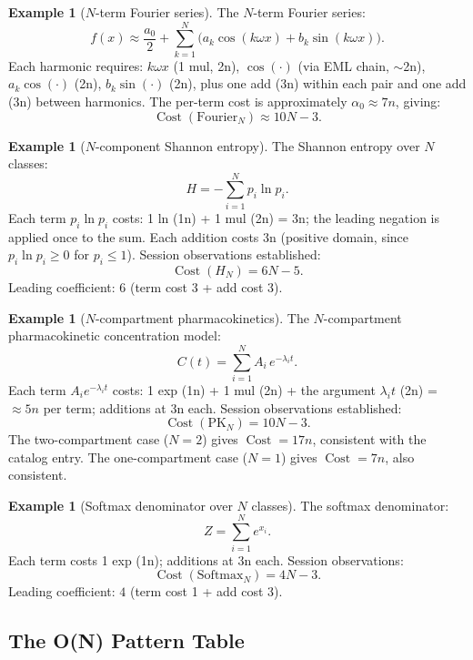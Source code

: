 \documentclass[12pt,a4paper]{article}
\theoremstyle{definition}
\newtheorem{example}[theorem]{Example}
\newcommand{\Cost}{\operatorname{Cost}}
\begin{document}
\begin{example}[$N$-term Fourier series]
\label{ex:fourier}
The $N$-term Fourier series:
\[
  f(x) \approx \frac{a_0}{2} + \sum_{k=1}^{N} \bigl(a_k \cos(k\omega x) + b_k \sin(k\omega x)\bigr).
\]
Each harmonic requires: $k\omega x$ (1 mul, 2n), $\cos(\cdot)$ (via
EML chain, $\sim$2n), $a_k \cos(\cdot)$ (2n), $b_k \sin(\cdot)$ (2n),
plus one add (3n) within each pair and one add (3n) between harmonics.
The per-term cost is approximately $\alpha_0 \approx 7n$, giving:
\[
  \boxed{\Cost(\text{Fourier}_N) \approx 10N - 3.}
\]
\end{example}

\begin{example}[$N$-component Shannon entropy]
\label{ex:entropy}
The Shannon entropy over $N$ classes:
\[
  H = -\sum_{i=1}^{N} p_i \ln p_i.
\]
Each term $p_i \ln p_i$ costs: 1 ln (1n) + 1 mul (2n) = 3n; the
leading negation is applied once to the sum.  Each addition costs 3n
(positive domain, since $p_i \ln p_i \geq 0$ for $p_i \leq 1$).
Session observations established:
\[
  \boxed{\Cost(H_N) = 6N - 5.}
\]
Leading coefficient: $6$ (term cost 3 + add cost 3).
\end{example}

\begin{example}[$N$-compartment pharmacokinetics]
\label{ex:pk}
The $N$-compartment pharmacokinetic concentration model:
\[
  C(t) = \sum_{i=1}^{N} A_i \, e^{-\lambda_i t}.
\]
Each term $A_i e^{-\lambda_i t}$ costs: 1 exp (1n) + 1 mul (2n) + the
argument $\lambda_i t$ (2n) = $\approx 5n$ per term; additions at 3n
each.  Session observations established:
\[
  \boxed{\Cost(\mathrm{PK}_N) = 10N - 3.}
\]
The two-compartment case ($N=2$) gives $\Cost = 17n$, consistent with
the catalog entry.  The one-compartment case ($N=1$) gives $\Cost = 7n$,
also consistent.
\end{example}

\begin{example}[Softmax denominator over $N$ classes]
\label{ex:softmax}
The softmax denominator:
\[
  Z = \sum_{i=1}^{N} e^{x_i}.
\]
Each term costs 1 exp (1n); additions at 3n each.  Session observations:
\[
  \boxed{\Cost(\mathrm{Softmax}_N) = 4N - 3.}
\]
Leading coefficient: $4$ (term cost 1 + add cost 3).
\end{example}

\subsection{The O(N) Pattern Table}
\end{document}
